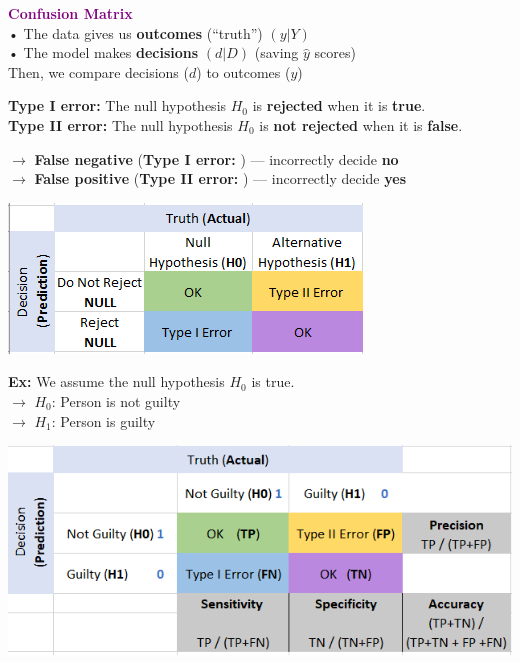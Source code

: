\documentclass[letterpaper, 10.5pt,landscape]{article}
\begin{document}
\begin{multicols*}{3}
\textbf{{\textcolor{purple}{Confusion Matrix}}} \\
• The data gives us \textbf{outcomes} (“truth”) $(y|Y)$ \\
• The model makes \textbf{decisions} $(d|D)$ (saving $\hat{y}$ scores) \\
Then, we compare decisions ($d$) to outcomes ($y$)

\vspace{3pt}
\textbf{Type I error: } The null hypothesis $H_{0}$ is \textbf{rejected} when it is \textbf{true}. \\

\textbf{Type II error: } The null hypothesis $H_{0}$ is \textbf{not rejected} when it is \textbf{false}.

$\rightarrow$ \textbf{False negative} (\textbf{Type I error: }) — incorrectly decide \textbf{no} \\
$\rightarrow$ \textbf{False positive} (\textbf{Type II error: }) — incorrectly decide \textbf{yes} \\


\begin{center}
    \begin{minipage}{0.75\linewidth}
        \includegraphics[width=\textwidth]{figures/Confusion_Matrix_1.PNG}
    \end{minipage}
\end{center}

\vspace{3pt}
\textbf{Ex:} We assume the null hypothesis $H_{0}$  is true. \\
$\rightarrow$ $H_{0}$: Person is not guilty  \\
$\rightarrow$ $H_{1}$: Person is guilty  \\


\begin{center}
    \begin{minipage}{\linewidth}
        \includegraphics[width=\textwidth]{figures/Confusion_Matrix_2.PNG}
    \end{minipage}
\end{center}



\end{multicols*}
\end{document}
